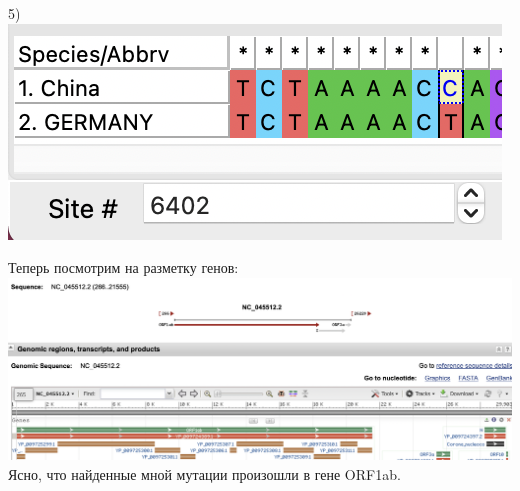 \documentclass[12pt]{article}
\begin{document}
5) \includegraphics[scale=0.8]{images/Mismatch5.png}\\

\newpage

Теперь посмотрим на разметку генов:\\
\includegraphics[scale=0.45]{images/razmetka.png}\\

Ясно, что найденные мной мутации произошли в гене ORF1ab.
\end{document}
